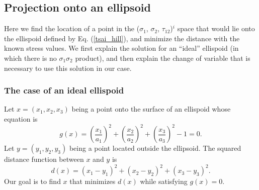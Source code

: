 \documentclass[]{article}
\begin{document}
\subsection{Projection onto an ellipsoid}

Here we find the location of a point in the ($\sigma_1$, $\sigma_2$, $\tau_{12}$)$^i$ space that would lie onto the ellispoid defined by Eq. (\ref{tsai_hill}), and minimize the distance with the known stress values.  We first explain the solution for an ``ideal'' ellispoid (in which there is no $\sigma_1\sigma_2$ product), and then explain the change of variable that is necessary to use this solution in our case.

\subsubsection{The case of an ideal ellispoid}
Let $x=(x_1,x_2,x_3)$ being a point onto the surface of an ellispoid whose equation is
\begin{equation}\label{ellipsoid}
	g(x)=\left(\frac{x_1}{a_1}\right)^2+\left(\frac{x_2}{a_2}\right)^2+\left(\frac{x_3}{a_3}\right)^2-1 =0.
\end{equation}
 Let $y=(y_1,y_2,y_3)$ being a point located outside the ellipsoid. The squared distance function between $x$ and $y$ is
 \begin{equation}
 	d(x) =(x_1-y_1)^2 + (x_2-y_2)^2 + (x_3-y_3)^2.
 \end{equation} 
Our goal is to find $x$ that minimizes $d(x)$ while satisfying $g(x)=0$.
\end{document}
